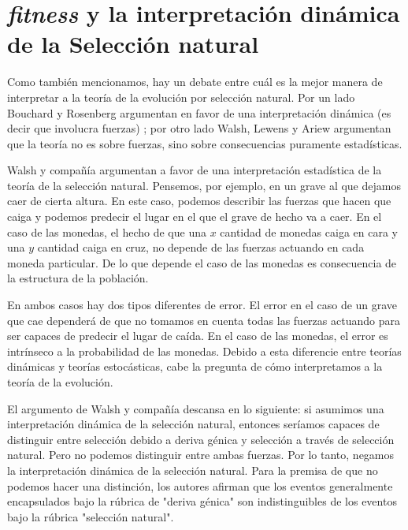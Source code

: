 \section{\emph{fitness} y la interpretación dinámica de la Selección natural}

Como también mencionamos, hay un debate entre cuál es la mejor manera de interpretar a la teoría de la evolución por selección natural. Por un lado Bouchard y Rosenberg argumentan en favor de una interpretación dinámica (es decir que involucra fuerzas) \citeyear{Bouchard2004}; por otro lado Walsh, Lewens y Ariew \citeyear{Walsh2002} argumentan que la teoría no es sobre fuerzas, sino sobre consecuencias puramente estadísticas.

Walsh y compañía argumentan a favor de una interpretación estadística de la teoría de la selección natural. Pensemos, por ejemplo, en un grave al que dejamos caer de cierta altura. En este caso, podemos describir las fuerzas que hacen que caiga y podemos predecir el lugar en el que el grave de hecho va a caer. En el caso de las monedas, el hecho de que una $x$ cantidad de monedas caiga en cara y una $y$ cantidad caiga en cruz, no depende de las fuerzas actuando en cada moneda particular. De lo que depende el caso de las monedas es consecuencia de la estructura de la población.

En ambos casos hay dos tipos diferentes de error. El error en el caso de un grave que cae dependerá de que no tomamos en cuenta todas las fuerzas actuando para ser capaces de predecir el lugar de caída. En el caso de las monedas, el error es intrínseco a la probabilidad de las monedas. Debido a esta diferencie entre teorías dinámicas y teorías estocásticas, cabe la pregunta de cómo interpretamos a la teoría de la evolución.

El argumento de Walsh y compañía descansa en lo siguiente: si asumimos una interpretación dinámica de la selección natural, entonces seríamos capaces de distinguir entre selección debido a deriva génica y selección a través de selección natural. Pero no podemos distinguir entre ambas fuerzas. Por lo tanto, negamos la interpretación dinámica de la selección natural. Para la premisa de que no podemos hacer una distinción, los autores afirman que los eventos generalmente encapsulados bajo la rúbrica de "deriva génica" son indistinguibles de los eventos bajo la rúbrica "selección natural".

